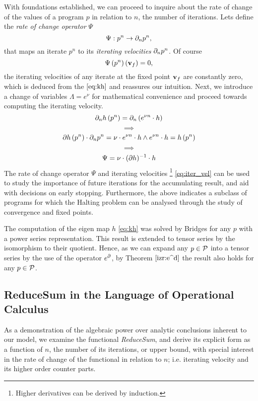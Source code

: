 With foundations established, we can proceed to inquire about the rate of change of the values of a program $p$ in relation to $n$, the number of iterations. Lets define the \emph{rate of change operator} $\Psi$ 
  \begin{equation}
    \Psi:p^n\to\partial_np^n,
  \end{equation}
that maps an iterate $p^n$ to its \emph{iterating velocities} $\partial_n p^n$. Of course
  \begin{equation}
  \Psi\left(p^n\right)\left(\mathbf{v}_f\right)=0,
  \end{equation}
the iterating velocities of any iterate at the fixed point $\mathbf{v}_f$ are constantly zero, which is deduced from the $\eqref{eq:kh}$ and reassures our intuition. Next, we introduce a change of variables $\Lambda= e^\nu$ for mathematical convenience and proceed towards computing the iterating velocity.
  $$\partial_nh\left(p^n\right)=\partial_n\left(e^{\nu n}\cdot h\right)$$
  $$\implies$$
  $$\partial h\left(p^n\right)\cdot\partial_np^n=\nu\cdot e^{\nu n}\cdot h \land e^{\nu n}\cdot h=h\left(p^n\right)$$
  $$\implies$$
  \begin{equation}\label{eq:iter_vel}
  \Psi=\nu\cdot(\partial h)^{-1}\cdot h
  \end{equation}
The rate of change operator $\Psi$ and iterating velocities
\footnote{Higher derivatives can be derived by induction.}
\eqref{eq:iter_vel} can be used to study the importance of future iterations for the accumulating result, and aid with decisions on early stopping. Furthermore, the above indicates a subclass of programs for which the Halting problem can be analysed through the study of convergence and fixed points.

The computation of the eigen map $h$ \eqref{eq:kh} was solved by Bridges \cite{bridges2016solution} for any $p$ with a power series representation. This result is extended to tensor series by the isomorphism to their quotient. Hence, as we can expand any $p\in\mathcal{P}$ into a tensor series by the use of the operator $e^\partial$, by Theorem $\ref{izr:e^d}$ the result also holds for any $p\in\mathcal{P}$. 


\subsection{ReduceSum in the Language of Operational Calculus}

As a demonstration of the algebraic power over analytic conclusions inherent to our model, we examine the functional \emph{ReduceSum}, and derive its explicit form as a function of $n$, the number of its iterations, or upper bound, with special interest in the rate of change of the functional in relation to $n$; i.e. iterating velocity and its higher order counter parts. 

